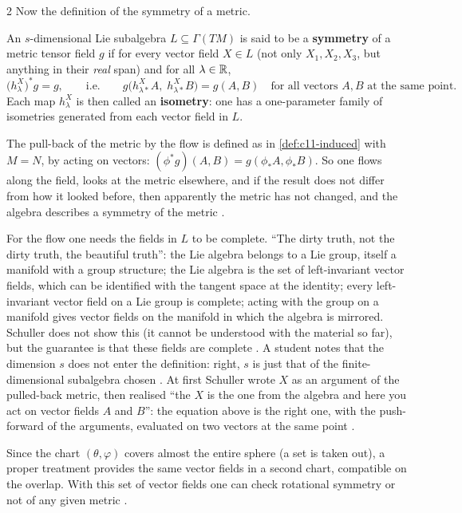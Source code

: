 \begin{paracol}{2}
Now the definition of the symmetry of a metric.

\begin{definition}\label{def:c11-symmetry}
An $s$-dimensional Lie subalgebra $L\subseteq\Gamma(TM)$ is said to be a \textbf{symmetry} of a metric tensor field $g$ if for every vector field $X\in L$ (not only $X_1,X_2,X_3$, but anything in their \emph{real} span) and for all $\lambda\in\mathbb{R}$,
\[
  \bigl(h^X_\lambda\bigr)^*g=g,\qquad\text{i.e.}\qquad g\bigl(h^X_{\lambda*}A,\;h^X_{\lambda*}B\bigr)=g(A,B)\quad\text{for all vectors }A,B\text{ at the same point}.
\]
Each map $h^X_\lambda$ is then called an \textbf{isometry}: one has a one-parameter family of isometries generated from each vector field in $L$.
\end{definition}
The pull-back of the metric by the flow is defined as in \cref{def:c11-induced} with $M=N$, by acting on vectors: $(\phi^*g)(A,B)=g(\phi_*A,\phi_*B)$. So one flows along the field, looks at the metric elsewhere, and if the result does not differ from how it looked before, then apparently the metric has not changed, and the algebra describes a symmetry of the metric .

\begin{coursenote}
For the flow one needs the fields in $L$ to be complete. ``The dirty truth, not the dirty truth, the beautiful truth'': the Lie algebra belongs to a Lie group, itself a manifold with a group structure; the Lie algebra is the set of left-invariant vector fields, which can be identified with the tangent space at the identity; every left-invariant vector field on a Lie group is complete; acting with the group on a manifold gives vector fields on the manifold in which the algebra is mirrored. Schuller does not show this (it cannot be understood with the material so far), but the guarantee is that these fields are complete .
A student notes that the dimension $s$ does not enter the definition: right, $s$ is just that of the finite-dimensional subalgebra chosen .
At first Schuller wrote $X$ as an argument of the pulled-back metric, then realised ``the $X$ is the one from the algebra and here you act on vector fields $A$ and $B$'': the equation above is the right one, with the push-forward of the arguments, evaluated on two vectors at the same point .
\end{coursenote}
Since the chart $(\theta,\varphi)$ covers almost the entire sphere (a set is taken out), a proper treatment provides the same vector fields in a second chart, compatible on the overlap. With this set of vector fields one can check rotational symmetry or not of any given metric .


\end{paracol}
